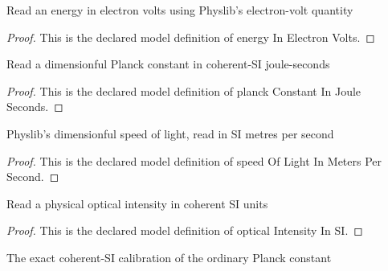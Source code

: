 \begin{definition}
  \label{def:physics:phyx-mini-0537:phyxminiproblems-problemphyxmini0537-energyinelectronvolts}
  Read an energy in electron volts using Physlib's electron-volt quantity
\end{definition}
\begin{proof}
  This is the declared model definition of energy In Electron Volts.
\end{proof}
\begin{definition}
  \label{def:physics:phyx-mini-0537:phyxminiproblems-problemphyxmini0537-planckconstantinjouleseconds}
  Read a dimensionful Planck constant in coherent-SI joule-seconds
\end{definition}
\begin{proof}
  This is the declared model definition of planck Constant In Joule Seconds.
\end{proof}
\begin{definition}
  \label{def:physics:phyx-mini-0537:phyxminiproblems-problemphyxmini0537-speedoflightinmeterspersecond}
  Physlib's dimensionful speed of light, read in SI metres per second
\end{definition}
\begin{proof}
  This is the declared model definition of speed Of Light In Meters Per Second.
\end{proof}
\begin{definition}
  \label{def:physics:phyx-mini-0537:phyxminiproblems-problemphyxmini0537-opticalintensityinsi}
  Read a physical optical intensity in coherent SI units
\end{definition}
\begin{proof}
  This is the declared model definition of optical Intensity In SI.
\end{proof}
\begin{definition}
  \label{def:physics:phyx-mini-0537:phyxminiproblems-problemphyxmini0537-ordinaryplanckconstantsivalue}
  The exact coherent-SI calibration of the ordinary Planck constant
\end{definition}
